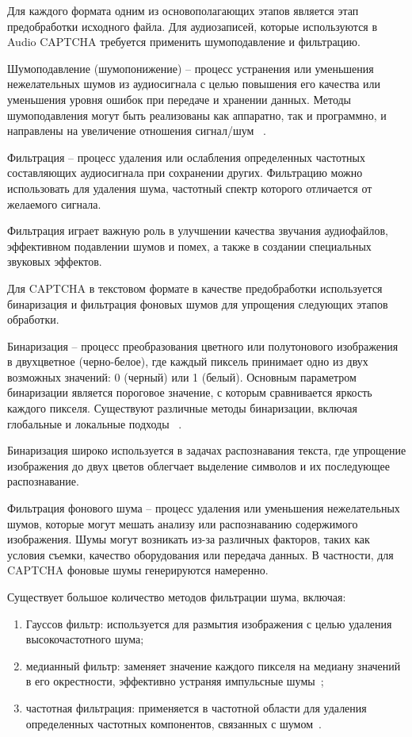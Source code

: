 Для каждого формата одним из основополагающих этапов является этап 
предобработки исходного файла. Для аудиозаписей, которые используются в Audio 
CAPTCHA требуется применить шумоподавление и фильтрацию.

Шумоподавление (шумопонижение) -- процесс устранения или уменьшения нежелательных 
шумов из аудиосигнала с целью повышения его качества или уменьшения уровня ошибок 
при передаче и хранении данных. Методы шумоподавления могут быть реализованы как 
аппаратно, так и программно, и направлены на увеличение отношения сигнал/шум
~\cite{noisecancellation}.

Фильтрация -- процесс удаления или ослабления определенных частотных составляющих 
аудиосигнала при сохранении других. Фильтрацию можно использовать для удаления 
шума, частотный спектр которого отличается от желаемого сигнала.

Фильтрация играет важную роль в улучшении качества звучания аудиофайлов, 
эффективном подавлении шумов и помех, а также в создании специальных звуковых 
эффектов.

Для CAPTCHA в текстовом формате в качестве предобработки используется бинаризация 
и фильтрация фоновых шумов для упрощения следующих этапов обработки.

Бинаризация -- процесс преобразования цветного или полутонового изображения в 
двухцветное (черно-белое), где каждый пиксель принимает одно из двух возможных 
значений: 0 (черный) или 1 (белый). Основным параметром бинаризации является 
пороговое значение, с которым сравнивается яркость каждого пикселя. Существуют 
различные методы бинаризации, включая глобальные и локальные подходы
~\cite{binary}.

Бинаризация широко используется в задачах распознавания текста, где упрощение 
изображения до двух цветов облегчает выделение символов и их последующее 
распознавание.

Фильтрация фонового шума -- процесс удаления или уменьшения нежелательных шумов, 
которые могут мешать анализу или распознаванию содержимого изображения. Шумы 
могут возникать из-за различных факторов, таких как условия съемки, качество 
оборудования или передача данных. В частности, для CAPTCHA фоновые шумы 
генерируются намеренно.

Существует большое количество методов фильтрации шума, включая:

\begin{enumerate}
    \item Гауссов фильтр: используется для размытия изображения с целью удаления 
    высокочастотного шума;
    \item медианный фильтр: заменяет значение каждого пикселя на медиану значений 
    в его окрестности, эффективно устраняя импульсные шумы~\cite{filtr};
    \item частотная фильтрация: применяется в частотной области для удаления 
    определенных частотных компонентов, связанных с шумом~\cite{filtr2}.
\end{enumerate}

